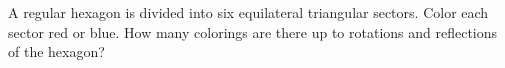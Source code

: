 A regular hexagon is divided into six equilateral triangular sectors. Color each sector red or blue. How many colorings are there up to rotations and reflections of the hexagon?
